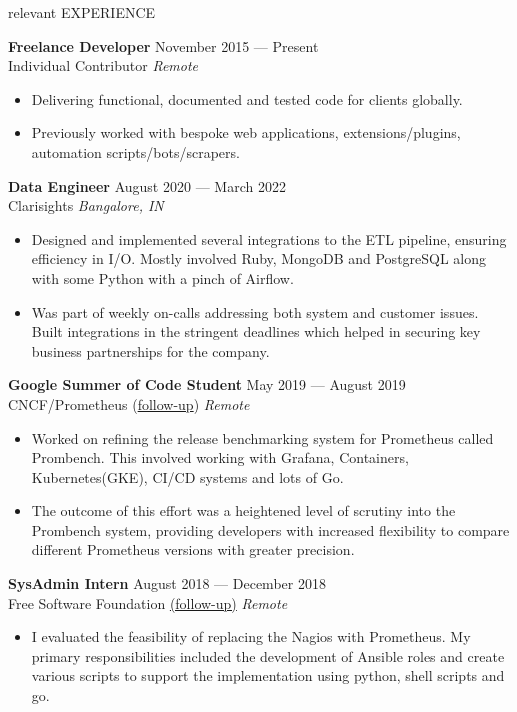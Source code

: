\documentclass{resume} %
\begin{document}
\begin{rSection}{relevant EXPERIENCE}

  \textbf{Freelance Developer} \hfill November 2015 — Present\\
  Individual Contributor \hfill \textit{Remote}
  \begin{itemize}
    \itemsep -3pt {}
    \item Delivering functional, documented and tested code for clients globally.
    \item Previously worked with bespoke web applications, extensions/plugins, automation scripts/bots/scrapers.
  \end{itemize}

  \textbf{Data Engineer} \hfill August 2020 — March 2022\\
  Clarisights \hfill \textit{Bangalore, IN}
  \begin{itemize}
    \itemsep -3pt {}
    \item Designed and implemented several integrations to the ETL pipeline, ensuring efficiency in I/O. Mostly involved Ruby, MongoDB and PostgreSQL along with some Python with a pinch of Airflow.
    \item Was part of weekly on-calls addressing both system and customer issues. Built integrations in the stringent deadlines which helped in securing key business partnerships for the company.
  \end{itemize}

  \textbf{Google Summer of Code Student} \hfill May 2019 — August 2019\\
  CNCF/Prometheus (\href{https://blog.geekodour.org/posts/gsoc19/}{follow-up}) \hfill \textit{Remote}
  \begin{itemize}
    \itemsep -3pt {}
    \item Worked on refining the release benchmarking system for Prometheus called Prombench. This involved working with Grafana, Containers, Kubernetes(GKE), CI/CD systems and lots of Go.
    \item The outcome of this effort was a heightened level of scrutiny into the Prombench system, providing developers with increased flexibility to compare different Prometheus versions with greater precision.
  \end{itemize}

  \textbf{SysAdmin Intern} \hfill August 2018 — December 2018\\
  Free Software Foundation \href{https://www.fsf.org/blogs/sysadmin/what-i-learned-during-my-internship-with-the-fsf-tech-team}{(follow-up)} \hfill \textit{Remote}
  \begin{itemize}
    \itemsep -3pt {}
    \item I evaluated the feasibility of replacing the Nagios with Prometheus. My primary responsibilities included the development of Ansible roles and create various scripts to support the implementation using python, shell scripts and go.
  \end{itemize}


\end{rSection}
\end{document}
